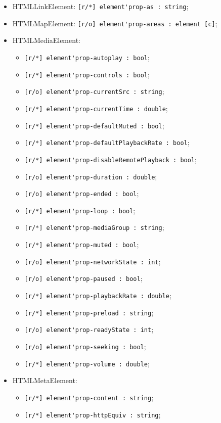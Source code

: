 \documentclass[a4paper, 14pt]{extarticle}
\newenvironment{icItems}
	{ \begin{itemize} [noitemsep,nolistsep] }
	{ \end{itemize} }
\begin{document}
\begin{icItems}
	\item HTMLLinkElement: \lstinline|[r/*] element'prop-as : string|;
	\item HTMLMapElement: \lstinline|[r/o] element'prop-areas : element [c]|;
	
	\item HTMLMediaElement:
	\begin{icItems}
		\item \lstinline|[r/*] element'prop-autoplay : bool|;
		\item \lstinline|[r/*] element'prop-controls : bool|;
		\item \lstinline|[r/o] element'prop-currentSrc : string|;
		\item \lstinline|[r/*] element'prop-currentTime : double|;
		\item \lstinline|[r/*] element'prop-defaultMuted : bool|;
		\item \lstinline|[r/*] element'prop-defaultPlaybackRate : bool|;
		\item \lstinline|[r/*] element'prop-disableRemotePlayback : bool|;
		\item \lstinline|[r/o] element'prop-duration : double|;
		\item \lstinline|[r/o] element'prop-ended : bool|;
		\item \lstinline|[r/*] element'prop-loop : bool|;
		\item \lstinline|[r/*] element'prop-mediaGroup : string|;
		\item \lstinline|[r/*] element'prop-muted : bool|;
		\item \lstinline|[r/o] element'prop-networkState : int|;
		\item \lstinline|[r/o] element'prop-paused : bool|;
		\item \lstinline|[r/*] element'prop-playbackRate : double|;
		\item \lstinline|[r/*] element'prop-preload : string|;
		\item \lstinline|[r/o] element'prop-readyState : int|;
		\item \lstinline|[r/o] element'prop-seeking : bool|;
		\item \lstinline|[r/*] element'prop-volume : double|;
	\end{icItems}
	
	\item HTMLMetaElement:
	\begin{icItems}
		\item \lstinline|[r/*] element'prop-content : string|;
		\item \lstinline|[r/*] element'prop-httpEquiv : string|;
	\end{icItems}
	

\end{icItems}
\end{document}

